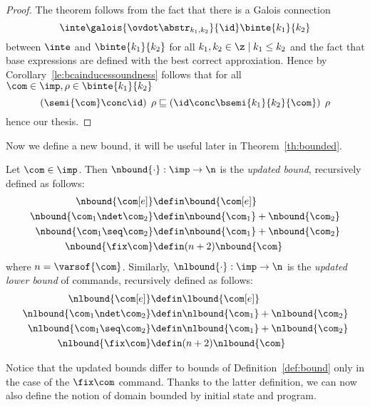 \begin{proof}
  The theorem follows from the fact that there is a Galois connection
  \begin{equation*}
    \inte\galois{\ovdot\abstr_{k_1, k_2}}{\id}\binte{k_1}{k_2}
  \end{equation*}
  between \(\inte\) and \(\binte{k_1}{k_2}\) for all
  \(k_1, k_2 \in \z \mid k_1 \leq k_2\) and the fact that base
  expressions are defined with the best correct approxiation. Hence by
  Corollary~\ref{le:bcainducessoundness} follows that for all
  \(\com\in\imp, \rho \in \binte{k_1}{k_2}\)
  \begin{equation*}
    \left(\semi{\com} \conc \id \right)\;\rho \sqsubseteq  \left(\id \conc \bsemi{k_1}{k_2}{\com}\right)\;\rho
  \end{equation*}
  hence our thesis.
\end{proof}

Now we define a new bound, it will be useful later in
Theorem~\ref{th:bounded}.

\begin{definition}\label{def:newbound}
  Let \(\com\in\imp\). Then \(\nbound{\cdot} : \imp \to \n\) is the
  \emph{updated bound}, recursively defined as follows:
  \begin{align*}
    \nbound{\com[e]} & \defin \bound{\com[e]} \\
    \nbound{\com_1 \ndet \com_2} & \defin \nbound{\com_1} + \nbound{\com_2} \\
    \nbound{\com_1 \seq \com_2} & \defin \nbound{\com_1} + \nbound{\com_2} \\
    \nbound{\fix\com} & \defin (n+2)\nbound{\com} \\
  \end{align*}
  where \(n = \varsof{\com}\). Similarly,
  \(\nlbound{\cdot} : \imp \to \n\) is the \emph{updated lower bound}
  of commands, recursively defined as follows:
  \begin{align*}
    \nlbound{\com[e]} & \defin \lbound{\com[e]} \\
    \nlbound{\com_1 \ndet \com_2} & \defin \nlbound{\com_1} + \nlbound{\com_2} \\
    \nlbound{\com_1 \seq \com_2} & \defin \nlbound{\com_1} + \nlbound{\com_2} \\
    \nlbound{\fix\com} & \defin (n+2)\nlbound{\com} \\
  \end{align*}
\end{definition}

Notice that the updated bounds differ to bounds of
Definition~\ref{def:bound} only in the case of the \(\fix\com\)
command.  Thanks to the latter definition, we can now also define the
notion of domain bounded by initial state and program.

